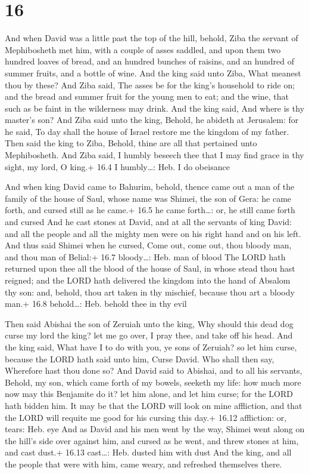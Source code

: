 \hypertarget{section-15}{%
\section{16}\label{section-15}}

 And when David was a little past the top of the hill,
behold, Ziba the servant of Mephibosheth met him, with a couple of asses
saddled, and upon them two hundred loaves of bread, and an hundred
bunches of raisins, and an hundred of summer fruits, and a bottle of
wine.  And the king said unto Ziba, What meanest thou by
these? And Ziba said, The asses be for the king's household to ride on;
and the bread and summer fruit for the young men to eat; and the wine,
that such as be faint in the wilderness may drink.  And the
king said, And where is thy master's son? And Ziba said unto the king,
Behold, he abideth at Jerusalem: for he said, To day shall the house of
Israel restore me the kingdom of my father.  Then said the
king to Ziba, Behold, thine are all that pertained unto Mephibosheth.
And Ziba said, I humbly beseech thee that I may find grace in thy sight,
my lord, O king.+ 16.4 I humbly\ldots: Heb. I do obeisance

 And when king David came to Bahurim, behold, thence came
out a man of the family of the house of Saul, whose name was Shimei, the
son of Gera: he came forth, and cursed still as he came.+ 16.5 he came
forth\ldots: or, he still came forth and cursed  And he cast
stones at David, and at all the servants of king David: and all the
people and all the mighty men were on his right hand and on his left.
 And thus said Shimei when he cursed, Come out, come out,
thou bloody man, and thou man of Belial:+ 16.7 bloody\ldots: Heb. man of
blood  The LORD hath returned upon thee all the blood of the
house of Saul, in whose stead thou hast reigned; and the LORD hath
delivered the kingdom into the hand of Absalom thy son: and, behold,
thou art taken in thy mischief, because thou art a bloody man.+ 16.8
behold\ldots: Heb. behold thee in thy evil

 Then said Abishai the son of Zeruiah unto the king, Why
should this dead dog curse my lord the king? let me go over, I pray
thee, and take off his head.  And the king said, What have
I to do with you, ye sons of Zeruiah? so let him curse, because the LORD
hath said unto him, Curse David. Who shall then say, Wherefore hast thou
done so?  And David said to Abishai, and to all his
servants, Behold, my son, which came forth of my bowels, seeketh my
life: how much more now may this Benjamite do it? let him alone, and let
him curse; for the LORD hath bidden him.  It may be that
the LORD will look on mine affliction, and that the LORD will requite me
good for his cursing this day.+ 16.12 affliction: or, tears: Heb. eye
 And as David and his men went by the way, Shimei went
along on the hill's side over against him, and cursed as he went, and
threw stones at him, and cast dust.+ 16.13 cast\ldots: Heb. dusted him
with dust  And the king, and all the people that were with
him, came weary, and refreshed themselves there.

